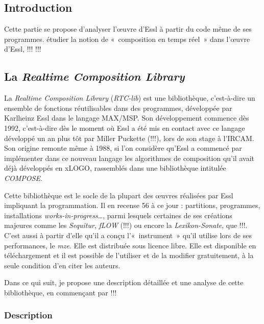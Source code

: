 \documentclass[a4paper,12pt]{article}
\newcommand{\guill}[1]{«~#1~»}
\newcommand{\maze}[0]{\emph{m\symbol{64}ze\textdegree2}}
\begin{document}
\subsection{Introduction}

Cette partie se propose d'analyser l'œuvre d'Essl à partir du code même de ses programmes. 
étudier la notion de \guill{composition en temps réel} dans l'œuvre d'Essl, !!! !!!

\subsection{La \emph{Realtime Composition Library}}

La \emph{Realtime Composition Library} (\emph{RTC-lib}) est une bibliothèque, c'est-à-dire un ensemble de fonctions réutilisables dans des programmes, développée par Karlheinz Essl dans le langage MAX/MSP. Son développement commence dès 1992, c'est-à-dire dès le moment où Essl a été mis en contact avec ce langage développé un an plus tôt par Miller Puckette (!!!), lors de son stage à l'IRCAM. Son origine remonte même à 1988, si l'on considère qu'Essl a commencé par implémenter dans ce nouveau langage les algorithmes de composition qu'il avait déjà développés en xLOGO, rassemblés dans une bibliothèque intitulée \emph{COMPOSE}.

Cette bibliothèque est le socle de la plupart des œuvres réalisées par Essl impliquant la programmation. Il en recense 56 à ce jour : partitions, programmes, installations \emph{works-in-progress}\dots, parmi lesquels certaines de ses créations majeures comme les \emph{Sequitur}, \emph{fLOW} (!!!) ou encore la \emph{Lexikon-Sonate}, que !!!. C'est aussi à partir d'elle qu'il a conçu l'\guill{instrument} qu'il utilise lors de ses performances, le \maze. Elle est distribuée sous licence libre. Elle est disponible en téléchargement et il est possible de l'utiliser et de la modifier gratuitement, à la seule condition d'en citer les auteurs.

Dans ce qui suit, je propose une description détaillée et une analyse de cette bibliothèque, en commençant par !!!


\subsubsection{Description}
\end{document}
